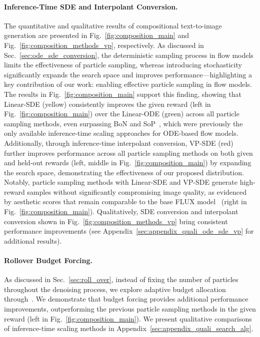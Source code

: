 \paragraph{Inference-Time SDE and Interpolant Conversion.} 
The quantitative and qualitative results of compositional text-to-image generation are presented in Fig.~\ref{fig:composition_main} and Fig.~\ref{fig:composition_methods_vp}, respectively. 
As discussed in Sec.~\ref{sec:ode_sde_conversion}, the deterministic sampling process in flow models limits the effectiveness of particle sampling, whereas introducing stochasticity significantly expands the search space and improves performance—highlighting a key contribution of our work: enabling effective particle sampling in flow models.
The results in Fig.~\ref{fig:composition_main} support this finding, showing that Linear-SDE (yellow) consistently improves the given reward (left in Fig.~\ref{fig:composition_main}) over the Linear-ODE (green) across all particle sampling methods, even surpassing BoN and SoP~\cite{Ma2025:SoP}, which were previously the only available inference-time scaling approaches for ODE-based flow models.
Additionally, through inference-time interpolant conversion, VP-SDE (red) further improves performance across all particle sampling methods on both given and held-out rewards (left, middle in Fig.~\ref{fig:composition_main}) by expanding the search space, demonstrating the effectiveness of our proposed distribution.
Notably, particle sampling methods with Linear-SDE and VP-SDE generate high-reward samples without significantly compromising image quality, as evidenced by aesthetic scores that remain comparable to the base FLUX model~\cite{BlackForestLabs:2024Flux} (right in Fig.~\ref{fig:composition_main}).
Qualitatively, SDE conversion and interpolant conversion shown in Fig.~\ref{fig:composition_methods_vp} bring consistent performance improvements (see Appendix~\ref{sec:appendix_quali_ode_sde_vp} for additional results). 

\vspace{-0.5\baselineskip}
\paragraph{Rollover Budget Forcing.} 
As discussed in Sec.~\ref{sec:roll_over}, instead of fixing the number of particles throughout the denoising process, we explore adaptive budget allocation through~\Ours{}. We demonstrate that budget forcing provides additional performance improvements, outperforming the previous particle sampling methods in the given reward (left in Fig.~\ref{fig:composition_main}). 
We present qualitative comparisons of inference-time scaling methods in Appendix~\ref{sec:appendix_quali_search_alg}. 



